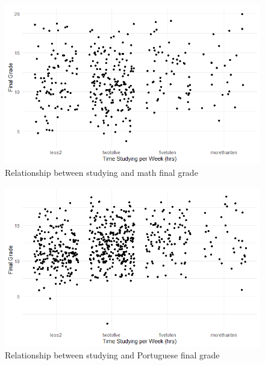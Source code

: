 \documentclass[12pt,english]{article}
\begin{document}
\begin{figure}[ht]
\centering
\bigskip{}
\includegraphics[width=.95\linewidth]{math_grades.png}
\caption{Relationship between studying and math final grade}
\label{fig:fig3}
\end{figure}
\begin{figure}[ht]
\centering
\bigskip{}
\includegraphics[width=.95\linewidth]{port_grades.png}
\caption{Relationship between studying and Portuguese final grade}
\label{fig:fig4}
\end{figure}
\pagebreak
\end{document}
